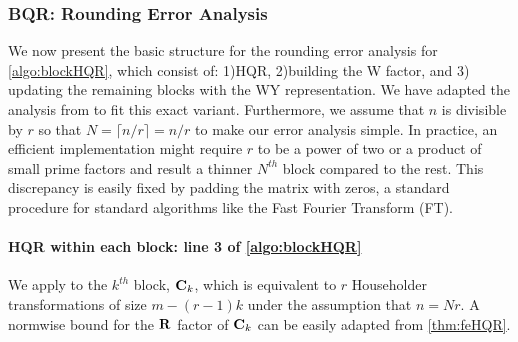 \subsubsection{BQR: Rounding Error Analysis}
We now present the basic structure for the rounding error analysis for \cref{algo:blockHQR}, which consist of: 1)HQR, 2)building the W factor, and 3) updating the remaining blocks with the WY representation.
We have adapted the analysis from \cite{Higham2002} to fit this exact variant.
Furthermore, we assume that $n$ is divisible by $r$ so that $N= \lceil n/r\rceil =n/r$ to make our error analysis simple.
In practice, an efficient implementation might require $r$ to be a power of two or a product of small prime factors and result a thinner $N^{th}$ block compared to the rest. 
This discrepancy is easily fixed by padding the matrix with zeros, a standard procedure for standard algorithms like the Fast Fourier Transform (FT).
\paragraph{HQR within each block: line 3 of \cref{algo:blockHQR}}
We apply  to the $k^{th}$ block, $\mathbf{C}_k$, which is equivalent to $r$ Householder transformations of size $m-(r-1)k$ under the assumption that $n=Nr$. 
A normwise bound for the $\mathbf{R}$ factor of $\mathbf{C}_{k}$ can be easily adapted from \cref{thm:feHQR}.
